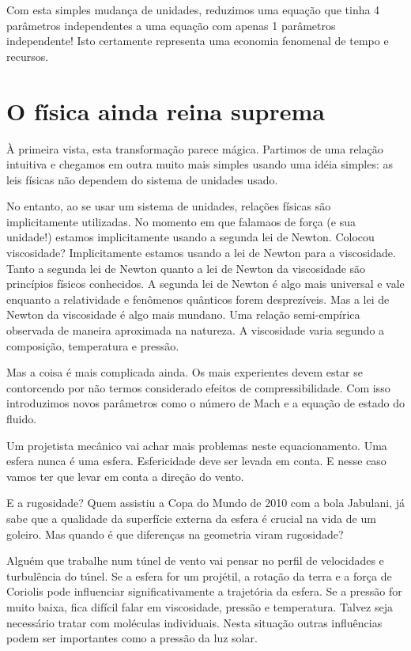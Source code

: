 Com esta simples mudança de unidades, reduzimos uma equação que tinha 4 parâmetros independentes a uma equação com apenas 1 parâmetros independente! Isto certamente representa uma economia fenomenal de tempo e recursos.

\section{O física ainda reina suprema}
À primeira vista, esta transformação parece mágica. Partimos de uma relação intuitiva e chegamos em outra muito mais simples usando uma idéia simples: as leis físicas não dependem do sistema de unidades usado.

No entanto, ao se usar um sistema de unidades, relações físicas são implicitamente utilizadas. No momento em que falamaos de força (e sua unidade!) estamos implicitamente usando a segunda lei de Newton. Colocou viscosidade? Implicitamente estamos usando a lei de Newton para a viscosidade. Tanto a segunda lei de Newton quanto a lei de Newton da viscosidade são princípios físicos conhecidos. A segunda lei de Newton é algo mais universal e vale enquanto a relatividade e fenômenos quânticos forem desprezíveis. Mas a lei de Newton da viscosidade é algo mais mundano. Uma relação semi-empírica observada de maneira aproximada na natureza. A viscosidade varia segundo a composição, temperatura e pressão.

Mas a coisa é mais complicada ainda. Os mais experientes devem estar se contorcendo por não termos considerado efeitos de compressibilidade. Com isso introduzimos novos parâmetros como o número de Mach e a equação de estado do fluido.

Um projetista mecânico vai achar mais problemas neste equacionamento. Uma esfera nunca é uma esfera. Esfericidade deve ser levada em conta. E nesse caso vamos ter que levar em conta a direção do vento.

E a rugosidade? Quem assistiu a Copa do Mundo de 2010 com a bola Jabulani, já sabe que a qualidade da superfície externa da esfera é crucial na vida de um goleiro. Mas quando é que diferenças na geometria viram rugosidade?

Alguém que trabalhe num túnel de vento vai pensar no perfil de velocidades e turbulência do túnel. Se a esfera for um projétil, a rotação da terra e a força de Coriolis pode influenciar significativamente a trajetória da esfera. Se a pressão for muito baixa, fica difícil falar em viscosidade, pressão e temperatura. Talvez seja necessário tratar com moléculas individuais. Nesta situação outras influências podem ser importantes como a pressão da luz solar.


